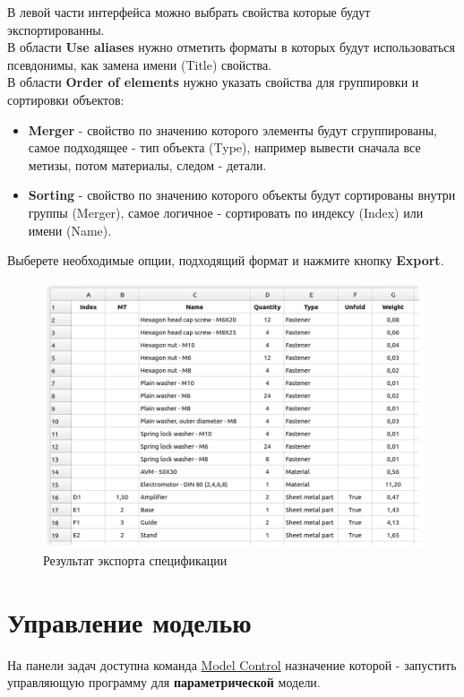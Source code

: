 \documentclass[a4paper,12pt]{article}
\begin{document}
В левой части интерфейса можно выбрать свойства которые будут экспортированны.\\

В области \textbf{Use aliases} нужно отметить форматы в которых будут использоваться псевдонимы, как замена имени (Title) свойства.\\

В области \textbf{Order of elements} нужно указать свойства для группировки и сортировки объектов:

\begin{itemize}
	\item \textbf{Merger} - свойство по значению которого элементы будут сгруппированы, самое подходящее - тип объекта (Type), например вывести сначала все метизы, потом материалы, следом - детали.
	\item \textbf{Sorting} - свойство по значению которого объекты будут сортированы внутри группы (Merger), самое логичное - сортировать по индексу (Index) или имени (Name).
\end{itemize}

\pagebreak

Выберете необходимые опции, подходящий формат и нажмите кнопку \textbf{Export}.

\begin{figure}[htp]
\centering
\includegraphics[width=1.0\textwidth]{img/specification_result.png}
\caption{Результат экспорта спецификации}
\label{sec:specification_result}
\end{figure}

\pagebreak



\section{Управление моделью}
На панели задач доступна команда \hyperref[sec:3]{Model Control} назначение которой - запустить управляющую программу для \textbf{параметрической} модели.\\
\end{document}
